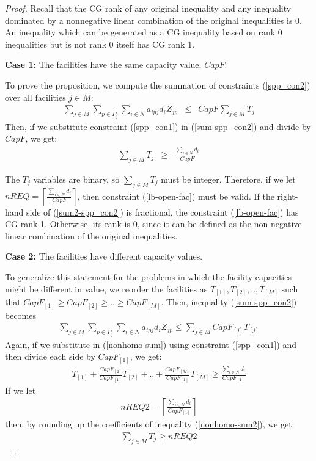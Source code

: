 \begin{proof}

Recall that the CG rank of any original inequality and any 
inequality dominated by a nonnegative linear combination of the original inequalities 
is 0.  An inequality which can be generated as a CG inequality based on rank 0 inequalities 
but is not rank 0 itself has CG rank 1. 

{\bf Case 1:} The facilities have the same capacity value, $CapF$.

To prove the proposition, we compute the
summation of constraints (\ref{spp_con2}) over all facilities $j \in M$:
\begin{eqnarray}
 \sum_{j \in M} \sum_{p \in P_j} \sum_{i \in N} a_{ipj} d_i Z_{jp} & \leq & CapF \sum_{j \in M} T_{j} \label{sum-spp_con2}
\end{eqnarray} 
Then, if we substitute constraint (\ref{spp_con1}) in (\ref{sum-spp_con2}) and divide by $CapF$, we get:
\begin{eqnarray}
 \sum_{j \in M} T_{j} &\geq &\frac {\sum_{i \in N}d_i}{CapF} \label{sum2-spp_con2}
\end{eqnarray} 

The $T_j$ variables are binary, so $\sum_{j \in M} T_{j}$ must be integer. 
Therefore, if we let 
$nREQ =\left \lceil \frac{\sum_{i \in N }d_i}{CapF} \right \rceil$, then constraint
(\ref{lb-open-fac}) must be valid. If the right-hand side of (\ref{sum2-spp_con2}) 
is fractional, the constraint (\ref{lb-open-fac}) has CG rank 1. Otherwise, its rank is 0,
since it can be defined as the non-negative linear combination of the original inequalities.
 

{\bf Case 2:} The facilities have different capacity values. 

To generalize this statement for the problems in which the facility
capacities might be different in value, we reorder the facilities as
$T_{[1]},T_{[2]},..,T_{[M]}$ such that $CapF_{[1]} \geq CapF_{[2]} \geq 
..\geq CapF_{[M]}$. Then, inequality (\ref{sum-spp_con2}) becomes 
\begin{eqnarray}
\sum_{j \in M} \sum_{p \in P_j} \sum_{i \in N} a_{ipj} d_i Z_{jp} \leq   \sum_{j \in M} CapF_{[j]}T_{[j]} \label{nonhomo-sum}
\end{eqnarray}  
Again, if we substitute in (\ref{nonhomo-sum}) using constraint (\ref{spp_con1}) and then divide each side by $CapF_{[1]}$, 
we get:
\begin{eqnarray}
\label{nonhomo-sum2}
 T_{[1]}+\frac{CapF_{[2]}}{CapF_{[1]}}T_{[2]}+..+ \frac{CapF_{[M]}}{CapF_{[1]}}T_{[M]} \geq \frac {\sum_{i \in N}d_i}{CapF_{[1]}} 
\end{eqnarray} 
If we let 
\begin{eqnarray}
 nREQ2 =\left \lceil \frac{\sum_{i \in N }d_i}{CapF_{[1]}} \right \rceil \nonumber 
\end{eqnarray}   
then, by rounding up the coefficients of inequality (\ref{nonhomo-sum2}), we get:
\begin{eqnarray}
\label{lb-open-fac2}
 \sum_{j \in M}T_j \geq nREQ2 
\end{eqnarray}  


\end{proof}
